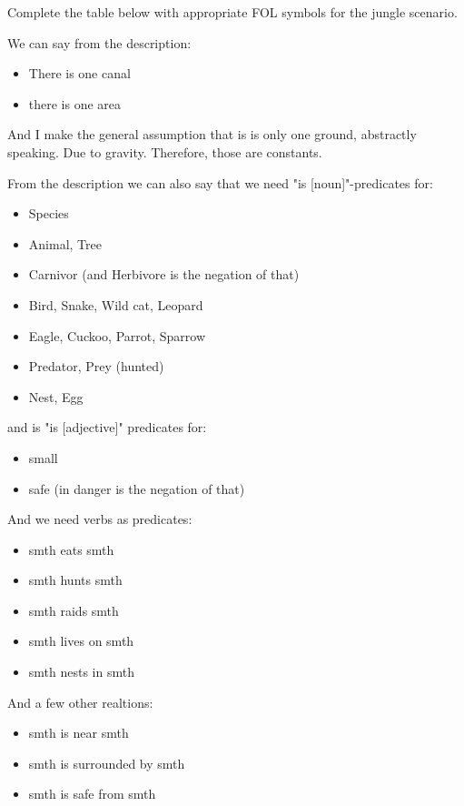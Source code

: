\documentclass[11pt,a4paper]{article}
\newenvironment{solution}{%
    \begin{tcolorbox}[
        breakable,
        colback=green!4,
        colframe=green!50!black,
        fonttitle=\bfseries,
        title={ Solution},
        left=6pt, right=6pt, top=4pt, bottom=4pt
    ]%
    }{%
    \end{tcolorbox}%
}
\begin{document}
    Complete the table below with appropriate FOL symbols for the jungle scenario. \\
    \begin{solution}
        We can say from the description:
        \begin{itemize}
            \item There is one canal
            \item there is one area
        \end{itemize}
        And I make the general assumption that is is only one ground, abstractly speaking. Due to gravity. Therefore, those are constants.

        From the description we can also say that we need "is [noun]"-predicates for:
        \begin{itemize}
            \item Species
            \item Animal, Tree
            \item Carnivor (and Herbivore is the negation of that)
            \item Bird, Snake, Wild cat, Leopard
            \item Eagle, Cuckoo, Parrot, Sparrow
            \item Predator, Prey (hunted)
            \item Nest, Egg
        \end{itemize}
        and is "is [adjective]" predicates for:
        \begin{itemize}
            \item small
            \item safe (in danger is the negation of that)
        \end{itemize}
        And we need verbs as predicates:
        \begin{itemize}
            \item smth eats smth
            \item smth hunts smth
            \item smth raids smth
            \item smth lives on smth
            \item smth nests in smth

        \end{itemize}
        And a few other realtions:
        \begin{itemize}
            \item smth is near smth
            \item smth is surrounded by smth
            \item smth is safe from smth
        \end{itemize}
    \end{solution}
\end{document}
